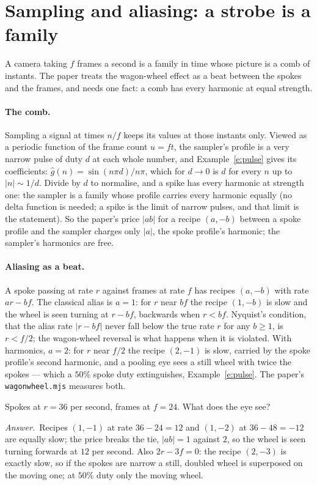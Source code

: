 \documentclass[10pt]{article}
\theoremstyle{plain}
\theoremstyle{definition}
\newcommand{\answer}{\par\smallskip\noindent\textit{Answer.}\ }
\begin{document}
\section{Sampling and aliasing: a strobe is a family}
\label{p:sampling}

\begin{why}
A camera taking $f$ frames a second is a family in time whose picture is a
comb of instants. The paper treats the wagon-wheel effect as a beat between
the spokes and the frames, and needs one fact: a comb has every harmonic at
equal strength.
\end{why}

\paragraph{The comb.}
Sampling a signal at times $n/f$ keeps its values at those instants only.
Viewed as a periodic function of the frame count $u=ft$, the sampler's
profile is a very narrow pulse of duty $d$ at each whole number, and
Example~\ref{e:pulse} gives its coefficients: $\hat g(n)=\sin(n\pi d)/n\pi$,
which for $d\to0$ is $d$ for every $n$ up to $|n|\sim1/d$. Divide by $d$ to
normalise, and a spike has every harmonic at strength one: the sampler is
a family whose profile carries every harmonic equally (no delta function
is needed; a spike is the limit of narrow pulses, and that limit is the
statement). So the paper's price $|ab|$ for a recipe $(a,-b)$ between a
spoke profile and the sampler charges only $|a|$, the spoke profile's
harmonic; the sampler's harmonics are free.

\paragraph{Aliasing as a beat.}
A spoke passing at rate $r$ against frames at rate $f$ has recipes
$(a,-b)$ with rate $ar-bf$. The classical alias is $a=1$: for $r$ near
$bf$ the recipe $(1,-b)$ is slow and the wheel is seen turning at $r-bf$,
backwards when $r<bf$. Nyquist's condition, that the alias rate $|r-bf|$
never fall below the true rate $r$ for any $b\ge1$, is $r<f/2$; the
wagon-wheel reversal is what happens when it is violated. With harmonics,
$a=2$: for $r$ near $f/2$ the recipe $(2,-1)$ is slow, carried by the spoke
profile's second harmonic, and a pooling eye sees a still wheel with twice
the spokes --- which a $50\%$ spoke duty extinguishes,
Example~\ref{e:pulse}. The paper's \texttt{wagonwheel.mjs} measures both.

\begin{checkyourself}
Spokes at $r=36$ per second, frames at $f=24$. What does the eye see?
\answer Recipes $(1,-1)$ at rate $36-24=12$ and $(1,-2)$ at $36-48=-12$
are equally slow; the price breaks the tie, $|ab|=1$ against $2$, so the
wheel is seen turning forwards at $12$ per second. Also $2r-3f=0$: the
recipe $(2,-3)$ is exactly slow, so if the spokes are narrow a still,
doubled wheel is superposed on the moving one; at $50\%$ duty only the
moving wheel.
\end{checkyourself}
\end{document}
